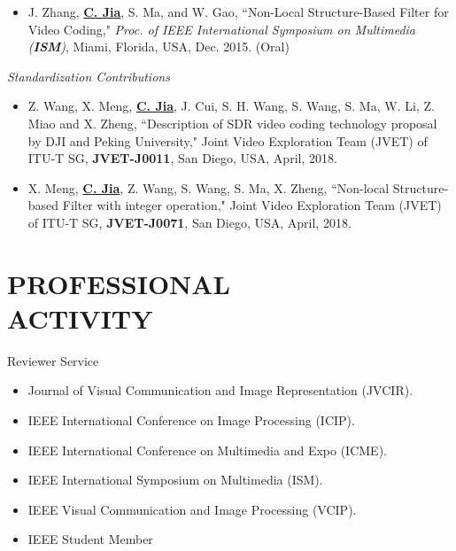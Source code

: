 \documentclass[margin, 10pt]{res} %
\begin{document}
\begin{resume}
\begin{itemize}
\item{J. Zhang, \underline{\bf C. Jia}, S. Ma, and W. Gao, ``Non-Local Structure-Based Filter for Video Coding," {\em Proc. of IEEE International Symposium on Multimedia ({\bf ISM})}, Miami, Florida, USA, Dec. 2015. (Oral)}

\end{itemize}

{\sl Standardization Contributions}
\begin{itemize}
\item{Z. Wang, X. Meng, \underline{\bf C. Jia}, J. Cui, S. H. Wang, S. Wang, S. Ma, W. Li, Z. Miao and X. Zheng, ``Description of SDR video coding technology proposal by DJI and Peking University," Joint Video Exploration Team (JVET) of ITU-T SG, {\bf JVET-J0011}, San Diego, USA, April, 2018. }
\item{X. Meng, \underline{\bf C. Jia}, Z. Wang, S. Wang, S. Ma, X. Zheng, ``Non-local Structure-based Filter with integer operation," Joint Video Exploration Team (JVET) of ITU-T SG, {\bf JVET-J0071}, San Diego, USA, April, 2018.}

\end{itemize}



\section{PROFESSIONAL \\ ACTIVITY}

Reviewer Service
\begin{itemize} \itemsep -2pt
\item{Journal of Visual Communication and Image Representation (JVCIR). }
\item{IEEE International Conference on Image Processing (ICIP).}
\item{IEEE International Conference on Multimedia and Expo (ICME). }
\item{IEEE International Symposium on Multimedia (ISM). }
\item{IEEE Visual Communication and Image Processing (VCIP). }
\item{IEEE Student Member}
\end{itemize}


\end{resume}
\end{document}
